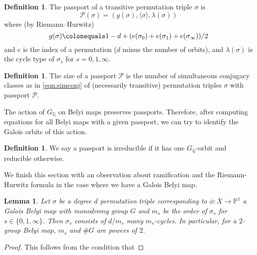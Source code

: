 \documentclass{dcthesis}
\newcommand{\PP}{\mathbb P}
\newcommand{\QQ}{\mathbb Q}
\newcommand{\defi}[1]{\textsf{#1}}
\numberwithin{equation}{section}
\newtheorem{lemma}[equation]{Lemma}
\theoremstyle{definition}
\newtheorem{definition}[equation]{Definition}
\theoremstyle{remark}
\begin{document}
{{{\begin{definition}
      \label{def:passportofpermutationtriple}
      The \defi{passport} of a transitive
      permutation triple $\sigma$ is
      \begin{equation}
        \label{eqn:passportofpermutationtriple}
        \mathcal{P}(\sigma)=
        (g(\sigma),\langle \sigma \rangle,
        \lambda(\sigma))
      \end{equation}
      where (by Riemann--Hurwitz)
      \begin{equation}
        \label{eqn:riemannhurwitzfortriples}
        g(\sigma) \colonequals
        1-d+(e(\sigma_0)+e(\sigma_1)+
        e(\sigma_\infty))/2
      \end{equation}
      and $e$ is the index of a
      permutation
      ($d$ minus the number of orbits), and
      $\lambda(\sigma)$ is the cycle
      type of $\sigma_s$ for $s=0,1,\infty$.
    \end{definition}
    \begin{definition}
      \label{def:passportsize}
      The
      \defi{size} of a passport $\mathcal{P}$
      is the number of simultaneous conjugacy
      classes as in \eqref{eqn:simconj} of
      (necessarily transitive) permutation
      triples $\sigma$ with passport $\mathcal{P}$.
    \end{definition}
    The action of $G_\QQ$ on
    Belyi maps preserves passports.
    Therefore, after computing equations
    for all Belyi maps with a given
    passport, we can try to
    identify the Galois orbits of this action.
    \begin{definition}
      \label{def:reduciblepassport}
      We say a passport is
      \defi{irreducible} if it has one
      $G_\QQ$-orbit and
      \defi{reducible} otherwise.
    \end{definition}
    We finish this section
    with an observation about ramification
    and the Riemann-Hurwitz formula
    in the case where we have a
    Galois Belyi map.
    \begin{lemma}\label{lem:regular}
      Let $\sigma$ be a degree $d$
      permutation triple corresponding to
      $\phi\colon X\to\PP^1$ a
      Galois Belyi map with monodromy group $G$
      and
      $m_s$ be the order of
      $\sigma_s$ for $s\in\{0,1,\infty\}$.
      Then $\sigma_s$ consists of
      $d/m_s$ many $m_s$-cycles.
      In particular,
      for a $2$-group Belyi map,
      $m_s$ and $\#G$ are powers of $2$.
    \end{lemma}
    \begin{proof}
      This follows from the condition that

\end{proof}}}}
\end{document}

